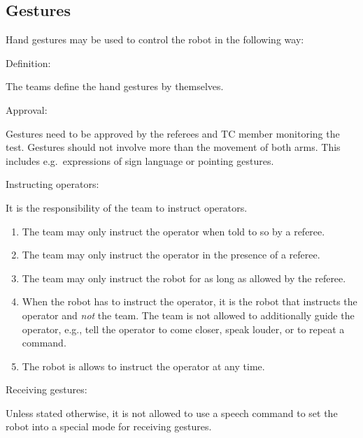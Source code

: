 \subsection{Gestures}
\label{rule:gestures}
Hand gestures may be used to control the robot in the following way:
\begin{enumerate}
	{\bf\item Definition:} The teams define the hand gestures by themselves. 
	{\bf\item Approval:} Gestures need to be approved by the referees and TC member monitoring the test. Gestures should not involve more than the movement of both arms. This includes e.g.~expressions of sign language or pointing gestures.
	{\bf\item Instructing operators:} It is the responsibility of the team to instruct operators.
	\begin{enumerate}
		\item The team may only instruct the operator when told to so by a referee.
		\item The team may only instruct the operator in the presence of a referee.
		\item The team may only instruct the robot for as long as allowed by the referee.
		\item When the robot has to instruct the operator, it is the robot that instructs the operator and \emph{not} the team. The team is not allowed to additionally guide the operator, e.g., tell the operator to come closer, speak louder, or to repeat a command.
		\item The robot is allows to instruct the operator at any time.
	\end{enumerate}
	{\bf\item Receiving gestures:} Unless stated otherwise, it is not allowed to use a speech command to set the robot into a special mode for receiving gestures.
\end{enumerate}



